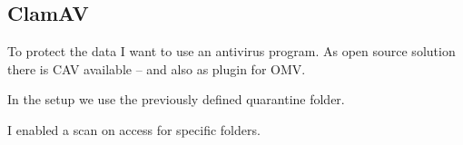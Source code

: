 

\subsection{ClamAV}\label{subsec:ClamAV}

To protect the data I want to use an antivirus program. As open source solution
there is \gls{CAV} available -- and also as plugin for \gls{OMV}.


In the setup we use the previously defined quarantine folder.


I enabled a scan on access for specific folders.


